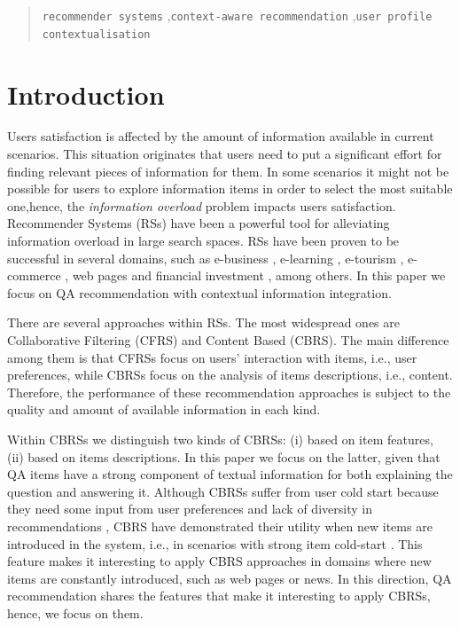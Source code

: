 \documentclass[preprint]{elsarticle}
\begin{document}
\begin{spacing}{1.5}
\begin{frontmatter}
\begin{abstract}
\begin{keyword}
   \texttt{recommender systems} \sep \texttt{context-aware recommendation} \sep \texttt{user profile contextualisation}
\end{keyword}
\end{abstract}

\end{frontmatter}

\section{Introduction}\label{sec:introduction}

Users satisfaction is affected by the amount of information available in current scenarios. This situation originates that users need to put a significant effort for finding relevant pieces of information for them. In some scenarios it might not be possible for users to explore information items in order to select the most suitable one,hence, the \emph{information overload} problem impacts users satisfaction. Recommender Systems (RSs) have been a powerful tool for alleviating information overload in large search spaces. RSs have been proven to be successful in several domains, such as e-business \cite{Lu2013}, e-learning \cite{Wu2015,Yera2014}, e-tourism \cite{Noguera2012,AlHassan2015}, e-commerce \cite{Rafailidis2016}, web pages \cite{Nguyen2014,Xuan2015} and financial investment \cite{Musto2015}, among others. In this paper we focus on QA recommendation with contextual information integration.

There are several approaches within RSs. The most widespread ones are Collaborative Filtering (CFRS) and Content Based (CBRS). The main difference among them is that CFRSs focus on users' interaction with items, i.e., user preferences, while CBRSs focus on the analysis of items descriptions, i.e., content. Therefore, the performance of these recommendation approaches is subject to the quality and amount of available information in each kind.

Within CBRSs we distinguish two kinds of CBRSs: (i) based on item features, (ii) based on items descriptions. In this paper we focus on the latter, given that QA items have a strong component of textual information for both explaining the question and answering it. Although CBRSs suffer from user cold start because they need some input from user preferences and lack of diversity in recommendations \cite{Barragans2010}, CBRS have demonstrated their utility when new items are introduced in the system, i.e., in scenarios with strong item cold-start \cite{Aggarwal2016}. This feature makes it interesting to apply CBRS approaches in domains where new items are constantly introduced, such as web pages or news. In this direction, QA recommendation shares the features that make it interesting to apply CBRSs, hence, we focus on them.


\end{spacing}
\end{document}
